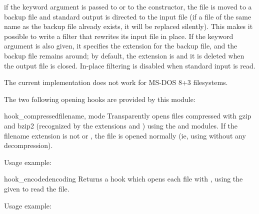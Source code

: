  if the keyword argument
 is passed to  or to the
 constructor, the file is moved to a backup file and
standard output is directed to the input file (if a file of the same
name as the backup file already exists, it will be replaced silently).
This makes it possible to write a filter that rewrites its input file
in place.  If the keyword argument  is also given, it specifies the extension for the backup
file, and the backup file remains around; by default, the extension is
 and it is deleted when the output file is closed.  In-place
filtering is disabled when standard input is read.

 The current implementation does not work for MS-DOS
8+3 filesystems.


The two following opening hooks are provided by this module:

\begin{funcdesc}{hook_compressed}{filename, mode}
  Transparently opens files compressed with gzip and bzip2 (recognized
  by the extensions  and ) using the 
  and  modules.  If the filename extension is not 
  or , the file is opened normally (ie,
  using  without any decompression).

  Usage example: 

\end{funcdesc}

\begin{funcdesc}{hook_encoded}{encoding}
  Returns a hook which opens each file with ,
  using the given  to read the file.

  Usage example:

\end{funcdesc}

